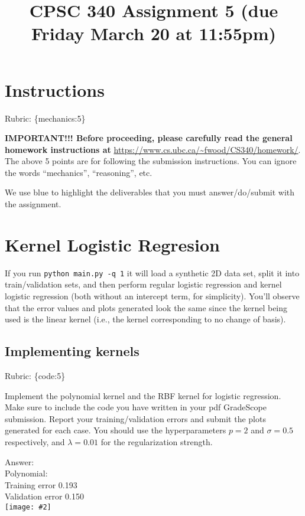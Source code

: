 \documentclass{article}
\def\rubric#1{\gre{Rubric: \{#1\}}}{}
\def\ans#1{\par\gre{Answer: #1}}
\def\blu#1{{\color{blu}#1}}
\def\gre#1{{\color{gre}#1}}
\newcommand{\fig}[2]{\texttt{[image: \#2]}}
\begin{document}
\title{CPSC 340 Assignment 5 (due Friday March 20 at 11:55pm)}
\date{}
\maketitle

\vspace{-7em}


\section*{Instructions}
\rubric{mechanics:5}

\textbf{IMPORTANT!!! Before proceeding, please carefully read the general homework instructions at} \url{https://www.cs.ubc.ca/~fwood/CS340/homework/}. The above 5 points are for following the submission instructions. You can ignore the words ``mechanics'', ``reasoning'', etc.

\vspace{1em}
We use \blu{blue} to highlight the deliverables that you must answer/do/submit with the assignment.


\section{Kernel Logistic Regresion}

If you run \verb|python main.py -q 1| it will load a synthetic 2D data set, split it into train/validation sets, and then perform regular logistic regression and kernel logistic regression (both without an intercept term, for simplicity). You'll observe that the error values and plots generated look the same since the kernel being used is the linear kernel (i.e., the kernel corresponding to no change of basis).

\subsection{Implementing kernels}
\rubric{code:5}

 \blu{Implement the polynomial kernel and the RBF kernel for logistic regression. Make sure to include the code you have written in your pdf GradeScope submission. Report your training/validation errors and submit the plots generated for each case}. You should use the hyperparameters $p=2$ and $\sigma=0.5$ respectively, and $\lambda=0.01$ for the regularization strength.
 
\ans{\\
Polynomial: \\
Training error 0.193\\
Validation error 0.150\\
}
\fig{0.8}{../figs/logRegPolyKernel}
\end{document}

